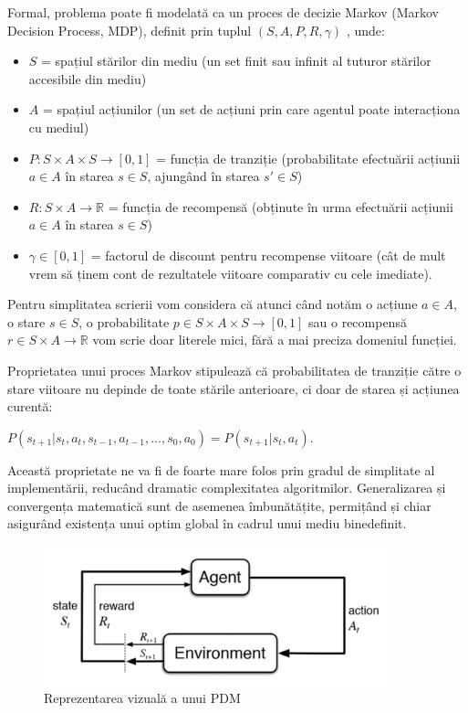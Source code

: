 Formal, problema poate fi modelată ca un proces de decizie Markov (Markov Decision Process, MDP), definit prin tuplul $(S, A, P, R, \gamma)$ \cite{markov_decision_process}, unde:
\begin{itemize}
    \item $S$ = spațiul stărilor din mediu (un set finit sau infinit al tuturor stărilor accesibile din mediu)
    \item $A$ = spațiul acțiunilor (un set de acțiuni prin care agentul poate interacționa cu mediul)
    \item $P: S\times A \times S \xrightarrow{} [0, 1] $ = funcția de tranziție (probabilitate efectuării acțiunii $a \in A$ în starea $s \in S$, ajungând în starea $s\prime \in S$)
    \item $R: S \times A \xrightarrow{} \mathbb{R}$ = funcția de recompensă (obținute în urma efectuării acțiunii $a \in A$ în starea $s \in S$)
    \item $\gamma \in [0, 1]$ = factorul de discount pentru recompense viitoare (cât de mult vrem să ținem cont de rezultatele viitoare comparativ cu cele imediate).
\end{itemize}

Pentru simplitatea scrierii vom considera că atunci când notăm o acțiune $a \in A$, o stare $s \in S$, o probabilitate $p \in S\times A \times S \xrightarrow{} [0, 1]$ sau o recompensă $r \in S \times A \xrightarrow{} \mathbb{R}$ vom scrie doar literele mici, fără a mai preciza domeniul funcției.

Proprietatea unui proces Markov stipulează că probabilitatea de tranziție către o stare viitoare nu depinde de toate stările anterioare, ci doar de starea și acțiunea curentă:
\begin{center}
$P(s_{t+1} | s_t, a_t, s_{t-1}, a_{t-1}, ..., s_0, a_0) = P(s_{t+1} | s_t, a_t)$.
\end{center}

Această proprietate ne va fi de foarte mare folos prin gradul de simplitate al implementării, reducând dramatic complexitatea algoritmilor. Generalizarea și convergența matematică sunt de asemenea îmbunătățite, permițând și chiar asigurând existența unui optim global în cadrul unui mediu binedefinit.

\begin{figure}[H]
\centering
\includegraphics[width=10cm]{images/reinforcement_learning_scheme.jpg}
\caption{Reprezentarea vizuală a unui PDM \cite{reinforcement_learning_scheme_image}}
\end{figure}

